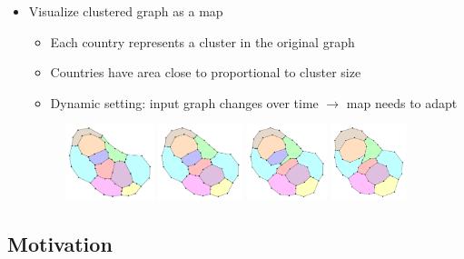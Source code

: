 \documentclass[t,18pt]{beamer}
\begin{document}
\begin{frame}
  \frametitle{}
  \begin{itemize}
    \item Visualize clustered graph as a map \begin{itemize}
      \item Each country represents a cluster in the original graph
      \item Countries have area close to proportional to cluster size
      \item Dynamic setting: input graph changes over time $\to$ map needs to adapt
    \end{itemize}
    \begin{figure}
      \includegraphics[height=2.2cm]{../Thesis/Resources/Evaluation-Example-Dynamics-AE097F3A-14FD-4735-A19B-8FD343CA3346-0.pdf}
      \includegraphics[height=2.2cm]{../Thesis/Resources/Evaluation-Example-Dynamics-AE097F3A-14FD-4735-A19B-8FD343CA3346-1.pdf}
      \includegraphics[height=2.2cm]{../Thesis/Resources/Evaluation-Example-Dynamics-AE097F3A-14FD-4735-A19B-8FD343CA3346-2.pdf}
      \includegraphics[height=2.2cm]{../Thesis/Resources/Evaluation-Example-Dynamics-AE097F3A-14FD-4735-A19B-8FD343CA3346-3.pdf}
    \end{figure}
  \end{itemize}
\end{frame}

\subsection{Motivation}
\label{subsect:motivation}
\end{document}
